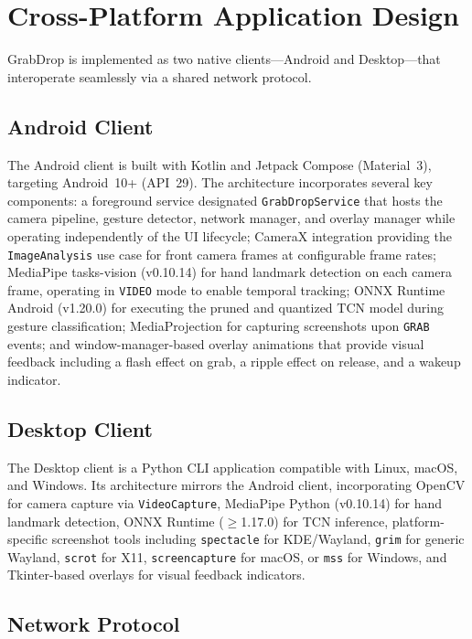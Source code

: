 \section{Cross-Platform Application Design}
\label{sec:application}

GrabDrop is implemented as two native clients---Android and
Desktop---that interoperate seamlessly via a shared network protocol.

\subsection{Android Client}

The Android client is built with Kotlin and Jetpack Compose
(Material~3), targeting Android~10+ (API~29). The architecture incorporates several key components: a foreground service designated \texttt{GrabDropService} that hosts the camera pipeline, gesture detector, network manager, and overlay manager while operating independently of the UI lifecycle; CameraX integration providing the \texttt{ImageAnalysis} use case for front camera frames at configurable frame rates; MediaPipe tasks-vision (v0.10.14) for hand landmark detection on each camera frame, operating in \texttt{VIDEO} mode to enable temporal tracking; ONNX Runtime Android (v1.20.0) for executing the pruned and quantized TCN model during gesture classification; MediaProjection for capturing screenshots upon \texttt{GRAB} events; and window-manager-based overlay animations that provide visual feedback including a flash effect on grab, a ripple effect on release, and a wakeup indicator.

\subsection{Desktop Client}

The Desktop client is a Python CLI application compatible with Linux,
macOS, and Windows. Its architecture mirrors the Android client,
incorporating OpenCV for camera capture via \texttt{VideoCapture}, MediaPipe Python (v0.10.14) for hand landmark detection, ONNX Runtime ($\geq$1.17.0) for TCN inference, platform-specific screenshot tools including \texttt{spectacle} for KDE/Wayland, \texttt{grim} for generic Wayland, \texttt{scrot} for X11, \texttt{screencapture} for macOS, or \texttt{mss} for Windows, and Tkinter-based overlays for visual feedback indicators.

\subsection{Network Protocol}

